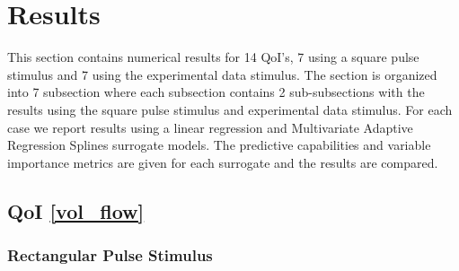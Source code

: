 \documentclass[12pt]{article}
\numberwithin{equation}{section}
\begin{document}
\section{Results}
This section contains numerical results for 14 QoI's, 7 using a square pulse stimulus and 7 using the experimental data stimulus. The section is organized into 7 subsection where each subsection contains 2 sub-subsections with the results using the square pulse stimulus and experimental data stimulus. For each case we report results using a linear regression and Multivariate Adaptive Regression Splines surrogate models. The predictive capabilities and variable importance metrics are given for each surrogate and the results are compared.

\newpage

\subsection{QoI \eqref{vol_flow}}

\subsubsection{Rectangular Pulse Stimulus}
\end{document}
